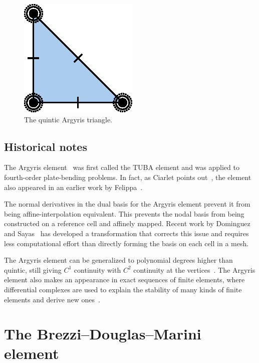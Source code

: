 \begin{figure}[H]
  \begin{center}
    \includegraphics[width=\smallwidth]{chapters/kirby-6/eps/ARG5.eps}
    \caption{The quintic Argyris triangle.}
  \end{center}
\end{figure}

\subsection{Historical notes}

The Argyris element~\cite{ArgyrisFriedEtAl1968} was first called the
TUBA element and was applied to fourth-order plate-bending problems.
In fact, as Ciarlet points out~\cite{Ciarlet2002}, the element also
appeared in an earlier work by Felippa~\cite{Felippa1966}.

The normal derivatives in the dual basis for the Argyris element
prevent it from being affine-interpolation equivalent. This prevents
the nodal basis from being constructed on a reference cell and
affinely mapped. Recent work by Dominguez and
Sayas~\cite{DominguezSayas2008} has developed a transformation that
corrects this issue and requires less computational effort than
directly forming the basis on each cell in a mesh.

The Argyris element can be generalized to polynomial degrees higher
than quintic, still giving \( C^1 \) continuity with \( C^2 \)
continuity at the vertices~\cite{SolinSegethEtAl2004}. The Argyris
element also makes an appearance in exact sequences of finite
elements, where differential complexes are used to explain the
stability of many kinds of finite elements and derive new
ones~\cite{ArnoldFalkEtAl2006}.

\newpage

\section{The Brezzi--Douglas--Marini element}

